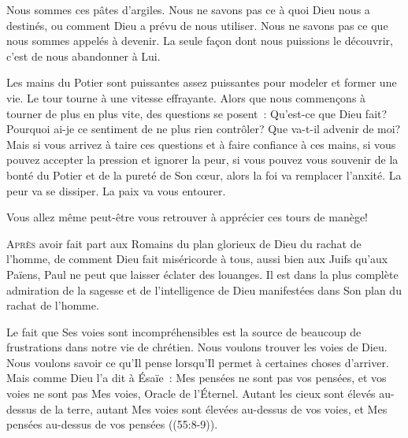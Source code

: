 Nous sommes ces pâtes d'argiles.
 Nous ne savons pas ce à quoi Dieu nous a destinés,
 ou comment Dieu a prévu de nous utiliser.
 Nous ne savons pas ce que nous sommes appelés à devenir.
 La seule fa\c{c}on dont nous puissions le découvrir,
 c'est de nous abandonner à Lui.


Les mains du Potier sont puissantes \ocadr assez puissantes pour modeler
 et former une vie. Le tour tourne à une vitesse effrayante.
 Alors que nous commen\c{c}ons à tourner de plus en plus vite,
 des questions se posent~: Qu'est-ce que Dieu fait?
 Pourquoi ai-je ce sentiment de ne plus rien contrôler?
 Que va-t-il advenir de moi? Mais si vous arrivez à taire ces questions
 et à faire confiance à ces mains, si vous pouvez accepter la pression
 et ignorer la peur, si vous pouvez vous souvenir de la bonté du Potier
 et de la pureté de Son c\oe{}ur, alors la foi va remplacer l'anxité.
 La peur va se dissiper. La paix va vous entourer.

Vous allez même peut-être vous retrouver à apprécier ces tours de manège!

\dvrule






\lettrine{A}{près} avoir fait part aux Romains
 du plan glorieux de Dieu du rachat de l'homme,
 de comment Dieu fait miséricorde à tous,
 aussi bien aux Juifs qu'aux Païens,
 Paul ne peut que laisser éclater des louanges.
 Il est dans la plus complète admiration de la sagesse
 et de l'intelligence de Dieu manifestées
 dans Son plan du rachat de l'homme.


Le fait que \Og Ses voies sont incompréhensibles \Fg{}
 est la source de beaucoup de frustrations dans notre vie de chrétien. 
 Nous voulons trouver les voies de Dieu. Nous voulons savoir ce qu'Il pense
 lorsqu'Il permet à certaines choses d'arriver.
 Mais comme Dieu l'a dit à Ésaïe~: 
 \Og Mes pensées ne sont pas vos pensées, et vos voies ne sont pas Mes voies,
 \ocadr Oracle de l'Éternel. Autant les cieux sont élevés au-dessus
 de la terre, autant Mes voies sont élevées au-dessus de vos voies,
 et Mes pensées au-dessus de vos pensées \Fg{}
 ((55:8-9)).

